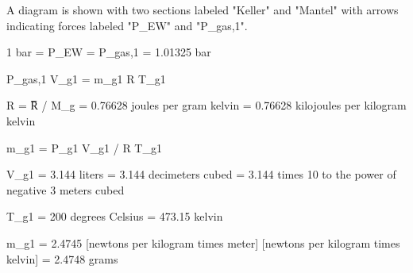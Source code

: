 A diagram is shown with two sections labeled "Keller" and "Mantel" with arrows indicating forces labeled "P_EW" and "P_gas,1". 

1 bar = P_EW = P_gas,1 = 1.01325 bar

P_gas,1 V_g1 = m_g1 R T_g1

R = R̅ / M_g = 0.76628 joules per gram kelvin = 0.76628 kilojoules per kilogram kelvin

m_g1 = P_g1 V_g1 / R T_g1

V_g1 = 3.144 liters = 3.144 decimeters cubed = 3.144 times 10 to the power of negative 3 meters cubed

T_g1 = 200 degrees Celsius = 473.15 kelvin

m_g1 = 2.4745 [newtons per kilogram times meter] [newtons per kilogram times kelvin] = 2.4748 grams